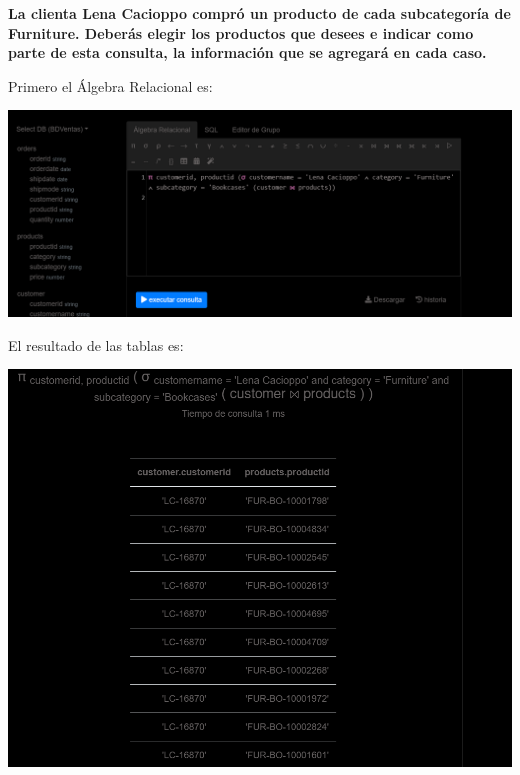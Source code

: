 \textbf{La clienta Lena Cacioppo compró un producto de cada subcategoría de Furniture. Deberás elegir los productos que
desees e indicar como parte de esta consulta, la información que se agregará en cada caso.} \vspace{.3cm}

Primero el Álgebra Relacional es:

\begin{center}
    \includegraphics[width=14cm]{resources/pregunta2/3.3.1.png}
\end{center}


El resultado de las tablas es:

\begin{center}
    \includegraphics[width=14cm]{resources/pregunta2/3.3.2.png}
\end{center}
